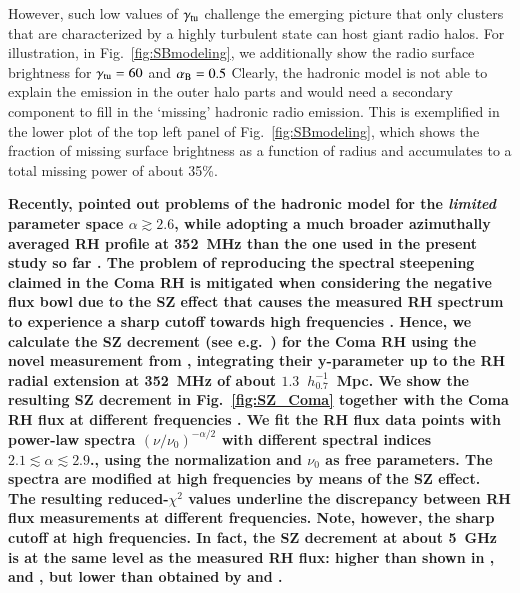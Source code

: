 \documentclass[useAMS,usenatbib]{mn2e}
\begin{document}
However, such low values of $\gamma_{{\mathrm{tu}}}$ challenge the emerging picture
that only clusters that are characterized by a highly turbulent state can host
giant radio halos. For illustration, in Fig.~\ref{fig:SBmodeling}, we
additionally show the radio surface brightness for $\gamma_{{\mathrm{tu}}} = 60$ and
$\alpha_{{\mathrm{B}}}=0.5$ Clearly, the hadronic model is not able to explain the
emission in the outer halo parts and would need a secondary component to fill in
the `missing' hadronic radio emission.  This is exemplified in the lower plot of
the top left panel of Fig.~\ref{fig:SBmodeling}, which shows the fraction of
missing surface brightness as a function of radius and accumulates to a total
missing power of about 35\%.


{\bf Recently, \citet{2012arXiv1207.3025B} pointed out problems of the hadronic model
for the {\em limited} parameter space $\alpha\gtrsim2.6$, while adopting a much
broader azimuthally averaged RH profile at 352~MHz \citep{2011MNRAS.412....2B}
than the one used in the present study so far \citep{1997A&A...321...55D}.
The problem of reproducing the spectral steepening claimed in the Coma RH is mitigated when 
considering the negative flux bowl due to the SZ effect that causes the measured
RH spectrum to experience a sharp cutoff towards high frequencies \citep{2004A&A...413...17P}.
Hence, we calculate the SZ decrement (see e.g.~\citealp{2002A&A...396L..17E}) for the Coma 
RH using the novel measurement from \cite{2012arXiv1208.3611P}, integrating their y-parameter 
up to the RH radial extension at 352~MHz of about $1.3$~$h_{0.7}^{-1}$~Mpc. We show the 
resulting SZ decrement in Fig.~\ref{fig:SZ_Coma} together with the Coma RH flux at different 
frequencies \citep{2003A&A...397...53T}. We fit the RH flux data points with power-law spectra 
$(\nu/\nu_{0})^{-\alpha/2}$ with different spectral indices $2.1\lesssim \alpha\lesssim2.9$., using 
the normalization and $\nu_{0}$ as free parameters. The spectra are modified at high frequencies by 
means of  the SZ effect. The resulting reduced-$\chi^{2}$ values underline the discrepancy between RH 
flux measurements at different frequencies. Note, however, the sharp cutoff at high frequencies.
In fact, the SZ decrement at about 5~GHz is at the same level as the measured RH flux: higher than
shown in \cite{2004JKAS...37..493B}, \cite{2004A&A...424..773R} and \cite{2010MNRAS.401...47D},
but lower than obtained by \cite{2002A&A...396L..17E} and \cite{2004A&A...413...17P}.}
\end{document}
